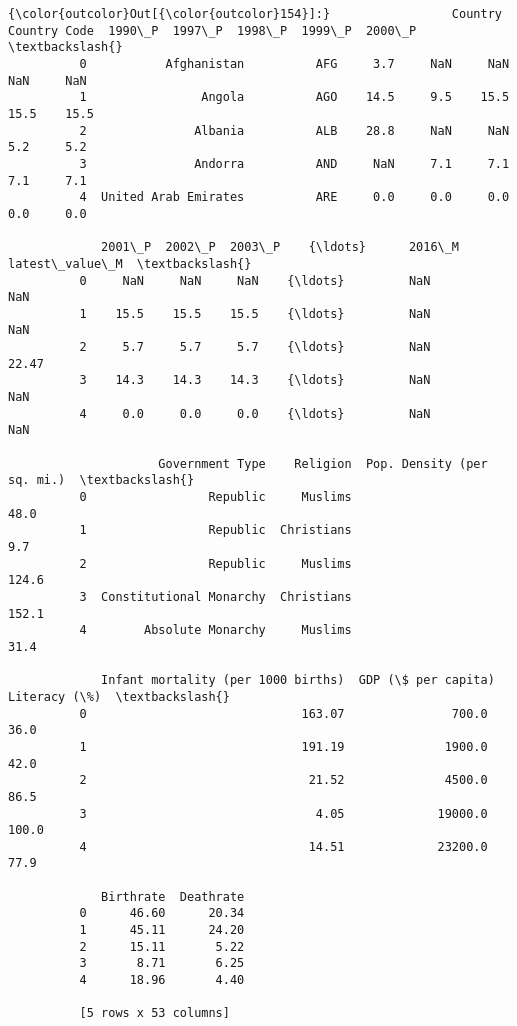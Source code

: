 \documentclass[11pt]{article}
\begin{document}
\begin{Verbatim}[commandchars=\\\{\}]
{\color{outcolor}Out[{\color{outcolor}154}]:}                 Country Country Code  1990\_P  1997\_P  1998\_P  1999\_P  2000\_P  \textbackslash{}
          0           Afghanistan          AFG     3.7     NaN     NaN     NaN     NaN   
          1                Angola          AGO    14.5     9.5    15.5    15.5    15.5   
          2               Albania          ALB    28.8     NaN     NaN     5.2     5.2   
          3               Andorra          AND     NaN     7.1     7.1     7.1     7.1   
          4  United Arab Emirates          ARE     0.0     0.0     0.0     0.0     0.0   
          
             2001\_P  2002\_P  2003\_P    {\ldots}      2016\_M  latest\_value\_M  \textbackslash{}
          0     NaN     NaN     NaN    {\ldots}         NaN             NaN   
          1    15.5    15.5    15.5    {\ldots}         NaN             NaN   
          2     5.7     5.7     5.7    {\ldots}         NaN           22.47   
          3    14.3    14.3    14.3    {\ldots}         NaN             NaN   
          4     0.0     0.0     0.0    {\ldots}         NaN             NaN   
          
                     Government Type    Religion  Pop. Density (per sq. mi.)  \textbackslash{}
          0                 Republic     Muslims                        48.0   
          1                 Republic  Christians                         9.7   
          2                 Republic     Muslims                       124.6   
          3  Constitutional Monarchy  Christians                       152.1   
          4        Absolute Monarchy     Muslims                        31.4   
          
             Infant mortality (per 1000 births)  GDP (\$ per capita)  Literacy (\%)  \textbackslash{}
          0                              163.07               700.0          36.0   
          1                              191.19              1900.0          42.0   
          2                               21.52              4500.0          86.5   
          3                                4.05             19000.0         100.0   
          4                               14.51             23200.0          77.9   
          
             Birthrate  Deathrate  
          0      46.60      20.34  
          1      45.11      24.20  
          2      15.11       5.22  
          3       8.71       6.25  
          4      18.96       4.40  
          
          [5 rows x 53 columns]
\end{Verbatim}
            
\end{document}
